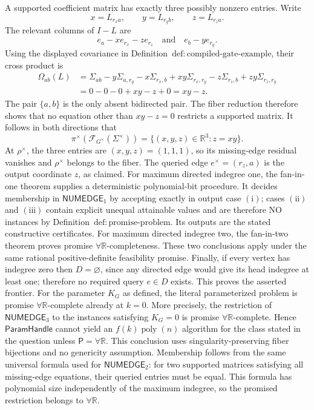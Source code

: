 A supported coefficient matrix has exactly three possibly nonzero entries.  Write
\[
x=L_{r_xa},\qquad y=L_{r_yb},\qquad z=L_{r_za}.
\]
The relevant columns of \(I-L\) are
\[
e_a-xe_{r_x}-ze_{r_z}
\quad\text{and}\quad
e_b-ye_{r_y}.
\]
Using the displayed covariance in Definition~\(\mathrm{def:compiled\mbox{-}gate\mbox{-}example}\), their cross product is
\[
\begin{aligned}
\Omega_{ab}(L)
&=\Sigma_{ab}-y\Sigma_{a,r_y}-x\Sigma_{r_x,b}
+xy\Sigma_{r_x,r_y}-z\Sigma_{r_z,b}+zy\Sigma_{r_z,r_y}\\
&=0-0-0+xy-z+0=xy-z.
\end{aligned}
\]
The pair \(\{a,b\}\) is the only absent bidirected pair.  The fiber reduction therefore shows that no equation other than \(xy-z=0\) restricts a supported matrix.  It follows in both directions that
\[
\pi^{\times}(\mathcal F_{G^{\times}}(\Sigma^{\times}))
=\{(x,y,z)\in\mathbb R^3:z=xy\}.
\]
At \(\rho^{\times}\), the three entries are \((x,y,z)=(1,1,1)\), so its missing-edge residual vanishes and \(\rho^{\times}\) belongs to the fiber.  The queried edge \(e^{\times}=(r_z,a)\) is the output coordinate \(z\), as claimed.
For maximum directed indegree one, the fan-in-one theorem supplies a deterministic polynomial-bit procedure.  It decides membership in \(\mathsf{NUMEDGE}_1\) by accepting exactly in output case \(\mathrm{(i)}\); cases \(\mathrm{(ii)}\) and \(\mathrm{(iii)}\) contain explicit unequal attainable values and are therefore NO instances by Definition~\(\mathrm{def:promise\mbox{-}problem}\).  Its outputs are the stated constructive certificates.  For maximum directed indegree two, the fan-in-two theorem proves promise \(\forall\mathbb R\)-completeness.  These two conclusions apply under the same rational positive-definite feasibility promise.  Finally, if every vertex has indegree zero then \(D=\varnothing\), since any directed edge would give its head indegree at least one; therefore no required query \(e\in D\) exists.  This proves the asserted frontier.
For the parameter \(K_G\) as defined, the literal parameterized problem is promise \(\forall\mathbb R\)-complete already at \(k=0\).  More precisely, the restriction of \(\mathsf{NUMEDGE}_3\) to the instances satisfying \(K_G=0\) is promise \(\forall\mathbb R\)-complete.  Hence \(\mathsf{ParamHandle}\) cannot yield an \(f(k)\operatorname{poly}(n)\) algorithm for the class stated in the question unless \(\mathsf P=\forall\mathbb R\).  This conclusion uses singularity-preserving fiber bijections and no genericity assumption.
Membership follows from the same universal formula used for \(\mathsf{NUMEDGE}_2\): for two supported matrices satisfying all missing-edge equations, their queried entries must be equal.  This formula has polynomial size independently of the maximum indegree, so the promised restriction belongs to \(\forall\mathbb R\).

